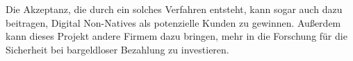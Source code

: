 Die Akzeptanz, die durch ein solches Verfahren entsteht, kann sogar auch dazu beitragen, Digital Non-Natives als potenzielle
Kunden zu gewinnen. Außerdem kann dieses Projekt andere Firmem dazu bringen, mehr in die Forschung für die Sicherheit bei
bargeldloser Bezahlung zu investieren.

